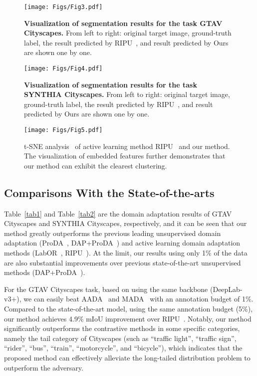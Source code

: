 \documentclass[journal]{IEEEtran}
\newcommand{\Tref}[1]{Table~\ref{#1}}
\begin{document}
\begin{figure*}[!htbp]
  \centering
  \texttt{[image: Figs/Fig3.pdf]}
  \caption{\textbf{Visualization of segmentation results for the task GTAV  Cityscapes.} From left to right: original target image, ground-truth label, the result predicted by RIPU~\cite{xie2022towards}, and result predicted by Ours are shown one by one.}
  \label{fig3}
  \vspace{-4mm}
\end{figure*}


\begin{figure*}[!htbp]
  \centering
  \texttt{[image: Figs/Fig4.pdf]}
  \caption{\textbf{Visualization of segmentation results for the task SYNTHIA  Cityscapes.} From left to right: original target image, ground-truth label, the result predicted by RIPU~\cite{xie2022towards}, and result predicted by Ours are shown one by one.}
  \label{fig4}
  \vspace{-4mm}
\end{figure*}


\begin{figure*}[!htp]
  \centering
  \texttt{[image: Figs/Fig5.pdf]}
  \caption{t-SNE analysis~\cite{van2008visualizing} of active learning method RIPU~\cite{xie2022towards} and our method. The visualization of embedded features further demonstrates that our method can exhibit the clearest clustering.}
  \label{fig5}
  \vspace{-4mm}
\end{figure*}


\subsection{Comparisons With the State-of-the-arts}
\label{sec:comparisons with the SOTA}

\Tref{tab1} and \Tref{tab2} are the domain adaptation results of GTAV  Cityscapes and SYNTHIA  Cityscapes, respectively, and it can be seen that our method greatly outperforms the previous leading unsupervised domain adaptation (ProDA~\cite{zhang2021prototypical}, DAP+ProDA~\cite{huo2022domain}) and active learning domain adaptation methods (LabOR~\cite{shin2021labor}, RIPU~\cite{xie2022towards}). At the limit, our results using only 1\% of the data are also substantial improvements over previous state-of-the-art unsupervised methods (DAP+ProDA~\cite{huo2022domain}).

For the GTAV  Cityscapes task, based on using the same backbone (DeepLab-v3+), we can easily beat AADA~\cite{su2020active} and MADA~\cite{ning2021multi} with an annotation budget of 1\%. Compared to the state-of-the-art model, using the same annotation budget (5\%), our method achieves 4.9\% mIoU improvement over RIPU~\cite{xie2022towards}. Notably, our method significantly outperforms the contrastive methods in some specific categories, namely the tail category of Cityscapes (such as ``traffic light'', ``traffic sign'', ``rider'', ``bus'', ``train'', ``motorcycle'', and ``bicycle''), which indicates that the proposed method can effectively alleviate the long-tailed distribution problem to outperform the adversary.
\end{document}
